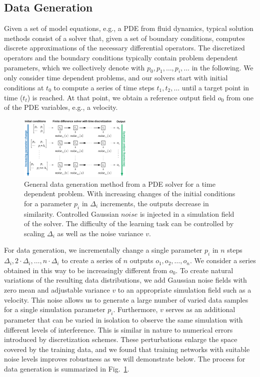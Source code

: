 \documentclass{article}
\begin{document}
\subsection{Data Generation} 
Given a set of model equations, e.g., a PDE from fluid dynamics, typical solution methods consist of a solver that, given a set of boundary conditions, computes discrete approximations of the necessary differential operators. The discretized operators and the boundary conditions typically contain problem dependent parameters, which we collectively denote with $p_0, p_1, \dotsc, p_i, \dotsc$ in the following. We only consider time dependent problems, and our solvers start with initial conditions at $t_0$ to compute a series of time steps $t_1, t_2, \dotsc$ until a target point in time ($t_t$) is reached. At that point, we obtain a reference output field $o_0$ from one of the PDE variables, e.g., a velocity.

\begin{figure}[htb]
    \centering
    \includegraphics[width=0.48\textwidth]{Images/DataGeneration}
    \vspace{-0.6cm}
    \caption{General data generation method from a PDE solver for a time dependent problem. With increasing changes of the initial conditions for a parameter $p_i$ in $\Delta_i$ increments, the outputs decrease in similarity. Controlled Gaussian $noise$ is injected in a simulation field of the solver. The difficulty of the learning task can be controlled by scaling $\Delta_i$ as well as the noise variance $v$.
    }
    \label{fig: data generation}
\end{figure}

For data generation, we incrementally change a single parameter $p_i$ in $n$ steps $\Delta_i, 2 \cdot \Delta_i, \dotsc, n \cdot \Delta_i$ to create a series of $n$ outputs $o_1, o_2, \dotsc, o_n$. We consider a series obtained in this way to be increasingly different from $o_0$. To create natural variations of the resulting data distributions, we add Gaussian noise fields with zero mean and adjustable variance $v$ to an appropriate simulation field such as a velocity. This noise allows us to generate a large number of varied data samples for a single simulation parameter $p_i$. Furthermore, $v$ serves as an additional parameter that can be varied in isolation to observe the same simulation with different levels of interference. This is similar in nature to numerical errors introduced by discretization schemes.
These perturbations enlarge the space covered by the training data, and we found that training networks with suitable noise levels improves robustness as we will demonstrate below. The process for data generation is summarized in Fig.~\ref{fig: data generation}.
\end{document}
